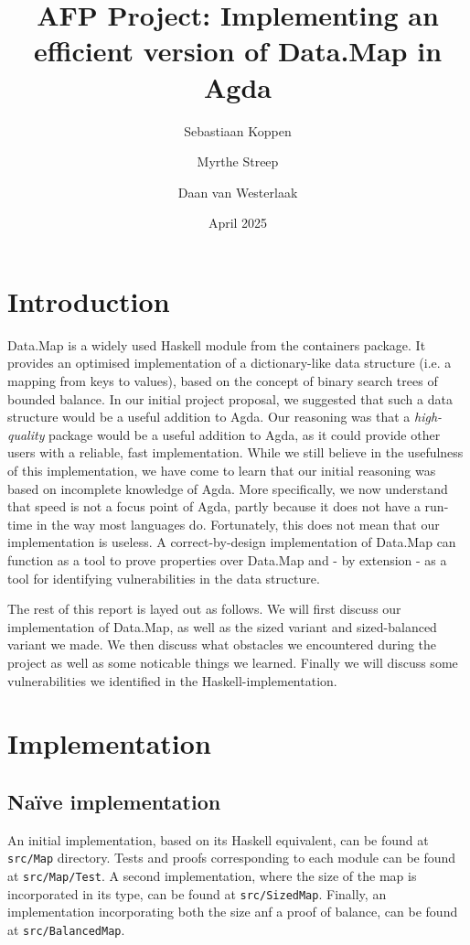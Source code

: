 \documentclass[a4paper,UKenglish,cleveref, autoref, thm-restate]{template/lipics-v2021}
\title{AFP Project: Implementing an efficient version of Data.Map in Agda}
\author{Sebastiaan Koppen}{Utrecht University, Netherlands}{}{}{}
\author{Myrthe Streep}{Utrecht University, Netherlands}{}{}{}
\author{Daan van Westerlaak}{Utrecht University, Netherlands}{}{}{}
\date{April 2025}
\begin{document}
\maketitle

\section{Introduction}
Data.Map is a widely used Haskell module from the containers package. It provides an optimised implementation of a dictionary-like data structure (i.e. a mapping from keys to values), based on the concept of binary search trees of bounded balance. In our initial project proposal, we suggested that such a data structure would be a useful addition to Agda. Our reasoning was that a \textit{high-quality} package would be a useful addition to Agda, as it could provide other users with a reliable, fast implementation. While we still believe in the usefulness of this implementation, we have come to learn that our initial reasoning was based on incomplete knowledge of Agda. More specifically, we now understand that speed is not a focus point of Agda, partly because it does not have a run-time in the way most languages do. Fortunately, this does not mean that our implementation is useless. A correct-by-design implementation of Data.Map can function as a tool to prove properties over Data.Map and - by extension - as a tool for identifying vulnerabilities in the data structure.

The rest of this report is layed out as follows. We will first discuss our implementation of Data.Map, as well as the sized variant and sized-balanced variant we made. We then discuss what obstacles we encountered during the project as well as some noticable things we learned. Finally we will discuss some vulnerabilities we identified in the Haskell-implementation.


\section{Implementation}
\subsection{Na\"ive implementation}
An initial implementation, based on its Haskell equivalent, can be found at \texttt{src/Map} directory. Tests and proofs corresponding to each module can be found at \texttt{src/Map/Test}. A second implementation, where the size of the map is incorporated in its type, can be found at \texttt{src/SizedMap}. Finally, an implementation incorporating both the size anf a proof of balance, can be found at \texttt{src/BalancedMap}.
\end{document}
